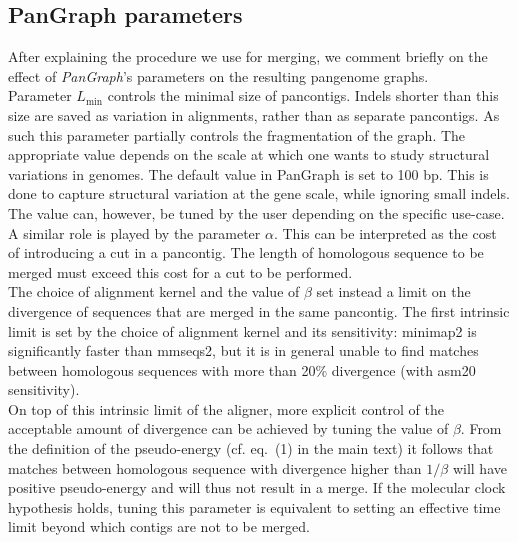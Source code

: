 \documentclass[aps,rmp,reprint,superscriptaddress,notitlepage,10pt,onecolumn]{revtex4-1}
\newcommand{\Lthr}{L_{\min}}
\begin{document}


\subsection{PanGraph parameters}

After explaining the procedure we use for merging, we comment briefly on the effect of \textit{PanGraph}'s parameters on the resulting pangenome graphs.\\

Parameter $\Lthr$ controls the minimal size of pancontigs. Indels shorter than this size are saved as variation in alignments, rather than as separate pancontigs. As such this parameter partially controls the fragmentation of the graph. The appropriate value depends on the scale at which one wants to study structural variations in genomes. The default value in PanGraph is set to 100 bp. This is done to capture structural variation at the gene scale, while ignoring small indels. The value can, however, be tuned by the user depending on the specific use-case.\\
A similar role is played by the parameter $\alpha$. This can be interpreted as the cost of introducing a cut in a pancontig. The length of homologous sequence to be merged must exceed this cost for a cut to be performed.\\

The choice of alignment kernel and the value of $\beta$ set instead a limit on the divergence of sequences that are merged in the same pancontig. The first intrinsic limit is set by the choice of alignment kernel and its sensitivity: minimap2 is significantly faster than mmseqs2, but it is in general unable to find matches between homologous sequences with more than 20\% divergence (with asm20 sensitivity).\\
On top of this intrinsic limit of the aligner, more explicit control of the acceptable amount of divergence can be achieved by tuning the value of $\beta$. From the definition of the pseudo-energy (cf. eq.~(1) in the main text) it follows that matches between homologous sequence with divergence higher than $1/\beta$ will have positive pseudo-energy and will thus not result in a merge. If the molecular clock hypothesis holds, tuning this parameter is equivalent to setting an effective time limit beyond which contigs are not to be merged. 
\end{document}
